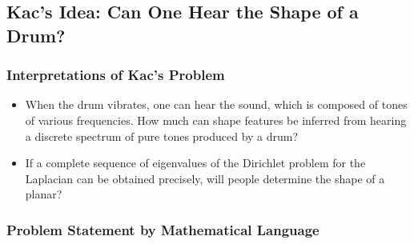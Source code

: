 



 \subsection{Kac’s Idea: Can One Hear the Shape of a Drum? \cite{kac1966can}}
  
   \subsubsection{Interpretations of Kac's Problem}

     \begin{itemize}
       \item When the drum vibrates, one can hear the sound, which is composed of tones of various frequencies. How much can shape features be inferred from hearing a discrete spectrum of pure tones produced by a drum?
       \item If a complete sequence of eigenvalues of the Dirichlet problem for the Laplacian can be obtained precisely, will people determine the shape of a planar?
     \end{itemize}
     
      
   \subsubsection{Problem Statement by Mathematical Language}

